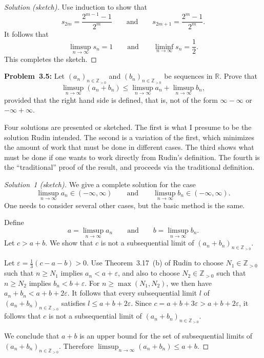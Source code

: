 \documentclass[10pt]{amsart}
\newcommand{\I}{\infty}
\newcommand{\andeqn}{\qquad {\mbox{and}} \qquad}
\newcommand{\ep}{\varepsilon}
\newcommand{\R}{{\mathbb{R}}}
\newcommand{\N}{{\mathbb{Z}}_{> 0}}
\newcommand{\A}{\qquad {\mbox{and}} \qquad}
\begin{document}
\vspace{1ex}

\begin{proof}[Solution (sketch)]
Use induction to show that
\[
s_{2 m} = \frac{2^{m - 1} - 1}{2^m} \andeqn
s_{2m + 1} = \frac{2^m - 1}{2^m}.
\]
It follows that
\[
\limsup_{n \to \I} s_n = 1 \andeqn
 \liminf_{n \to \I} s_n = {\textstyle{\frac{1}{2}}}.
\]
This completes the sketch.
\end{proof}

\vspace{2ex}

\noindent
{\textbf{Problem~3.5:}}
Let $(a_n)_{n \in \N}$ and $(b_n)_{n \in \N}$ be sequences in $\R$.
Prove that
\[
\limsup_{n \to \I} (a_n + b_n)
   \leq \limsup_{n \to \I} a_n + \limsup_{n \to \I} b_n,
\]
provided that the right hand side is defined, that is, not of the
form $\I - \I$ or $- \I + \I$.

\vspace{1ex}

Four solutions are presented or sketched.
The first is what I presume to be the solution Rudin intended.
The second is a variation of the first, which minimizes the
amount of work that must be done in different cases.
The third shows what must be done if one wants to work directly
from Rudin's definition.
The fourth is the ``traditional'' proof of the result, and proceeds
via the traditional definition.

\vspace{1ex}

\begin{proof}[Solution~1 (sketch)]
We give a complete solution for the case
\[
\limsup_{n \to \I} a_n \in (-\I, \I)
 \A \limsup_{n \to \I} b_n \in (-\I, \I).
\]
One needs to consider several other cases,
but the basic method is the same.

Define
\[
a = \limsup_{n \to \I} a_n \A b = \limsup_{n \to \I} b_n.
\]
Let $c > a + b$.
We show that $c$ is not a subsequential limit
of $(a_n + b_n)_{n \in \N}$.

Let $\ep = \frac{1}{3} (c - a - b) > 0$.
Use Theorem~3.17~(b) of Rudin to choose $N_1 \in \N$ such that
$n \geq N_1$ implies $a_n < a + \ep$, and also to
choose $N_2 \in \N$ such that $n \geq N_2$ implies $b_n < b + \ep$.
For $n \geq \max (N_1, N_2)$, we then have
$a_n + b_n < a + b + 2 \ep$.
It follows that every subsequential limit $l$ of
$(a_n + b_n)_{n \in \N}$ satisfies $l \leq a + b + 2 \ep$.
Since $c = a + b + 3 \ep > a + b + 2 \ep$, it follows that
$c$ is not a subsequential limit of $(a_n + b_n)_{n \in \N}$.

We conclude that $a + b$ is an upper bound for the set of
subsequential limits of $(a_n + b_n)_{n \in \N}$.
Therefore $\limsup_{n \to \I} (a_n + b_n) \leq a + b$.
\end{proof}
\end{document}
